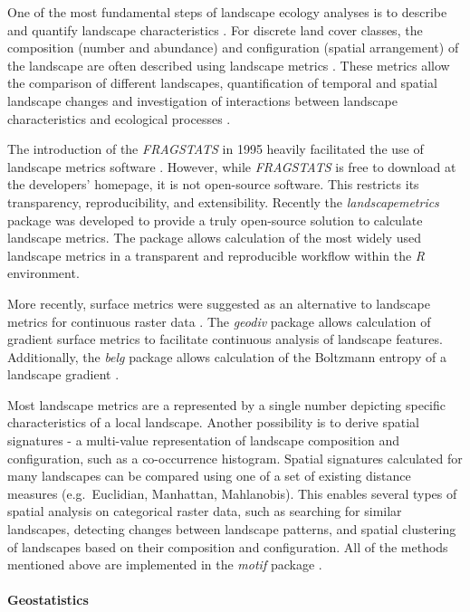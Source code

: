 \documentclass[smallextended]{svjour3}       %
\begin{document}
One of the most fundamental steps of landscape ecology analyses is to describe and quantify landscape characteristics \cite{Turner2005,Lausch2015}.
For discrete land cover classes, the composition (number and abundance) and configuration (spatial arrangement) of the landscape are often described using landscape metrics \cite{Gustafson1998,Uuemaa2009,Uuemaa2013,Gustafson2019}.
These metrics allow the comparison of different landscapes, quantification of temporal and spatial landscape changes and investigation of interactions between landscape characteristics and ecological processes \cite{Uuemaa2009}.

The introduction of the \emph{FRAGSTATS} in 1995 heavily facilitated the use of landscape metrics software \cite{McGarigal2012,Kupfer2012,Gustafson2019}.
However, while \emph{FRAGSTATS} is free to download at the developers' homepage, it is not open-source software.
This restricts its transparency, reproducibility, and extensibility.
Recently the \emph{landscapemetrics} package \cite{Hesselbarth2019a} was developed to provide a truly open-source solution to calculate landscape metrics.
The package allows calculation of the most widely used landscape metrics in a transparent and reproducible workflow within the \emph{R} environment.

More recently, surface metrics were suggested as an alternative to landscape metrics for continuous raster data \cite{McGarigal2009}.
The \emph{geodiv} package \cite{Smith2020} allows calculation of gradient surface metrics to facilitate continuous analysis of landscape features.
Additionally, the \emph{belg} package allows calculation of the Boltzmann entropy of a landscape gradient \cite{R-belgpaper}.

Most landscape metrics are a represented by a single number depicting specific characteristics of a local landscape.
Another possibility is to derive spatial signatures - a multi-value representation of landscape composition and configuration, such as a co-occurrence histogram.
Spatial signatures calculated for many landscapes can be compared using one of a set of existing distance measures (e.g.~Euclidian, Manhattan, Mahlanobis).
This enables several types of spatial analysis on categorical raster data, such as searching for similar landscapes, detecting changes between landscape patterns, and spatial clustering of landscapes based on their composition and configuration.
All of the methods mentioned above are implemented in the \emph{motif} package \cite{R-motif}.

\hypertarget{geostatistics}{%
\paragraph{Geostatistics}\label{geostatistics}}
\end{document}
